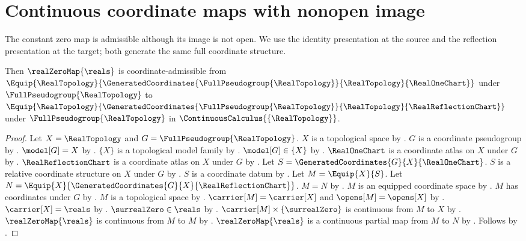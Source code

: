 \section{Continuous coordinate maps with nonopen image}





The constant zero map is admissible although its image is not open.
We use the identity presentation at the source and the reflection presentation
at the target; both generate the same full coordinate structure.

\begin{theorem}\label{real_zero_coordinate_map}
    Then $\realZeroMap{\reals}$ is coordinate-admissible
        from $\Equip{\RealTopology}{\GeneratedCoordinates{\FullPseudogroup{\RealTopology}}{\RealTopology}{\RealOneChart}}$
        under $\FullPseudogroup{\RealTopology}$
        to $\Equip{\RealTopology}{\GeneratedCoordinates{\FullPseudogroup{\RealTopology}}{\RealTopology}{\RealReflectionChart}}$
        under $\FullPseudogroup{\RealTopology}$ in $\ContinuousCalculus{\{\RealTopology\}}$.
\end{theorem}
\begin{proof}
    Let $X=\RealTopology$ and $G=\FullPseudogroup{\RealTopology}$.
    $X$ is a topological space by .
    $G$ is a coordinate pseudogroup by .
    $\model[G]=X$ by .
    $\{X\}$ is a topological model family by .
    $\model[G]\in\{X\}$ by .
    $\RealOneChart$ is a coordinate atlas on $X$ under $G$ by .
    $\RealReflectionChart$ is a coordinate atlas on $X$ under $G$ by .
    Let $S=\GeneratedCoordinates{G}{X}{\RealOneChart}$.
    $S$ is a relative coordinate structure on $X$ under $G$ by .
    $S$ is a coordinate datum by .
    Let $M=\Equip{X}{S}$.
    Let $N=\Equip{X}{\GeneratedCoordinates{G}{X}{\RealReflectionChart}}$.
    $M=N$ by .
    $M$ is an equipped coordinate space by .
    $M$ has coordinates under $G$ by .
    $M$ is a topological space by .
    $\carrier[M]=\carrier[X]$ and $\opens[M]=\opens[X]$ by
        .
    $\carrier[X]=\reals$ by .
    $\surrealZero\in\reals$ by .
    $\carrier[M]\times\{\surrealZero\}$ is continuous from $M$ to $X$ by
        .
    $\realZeroMap{\reals}$ is continuous from $M$ to $M$ by
        .
    $\realZeroMap{\reals}$ is a continuous partial map from $M$ to $N$ by
        .
    Follows by .
\end{proof}

